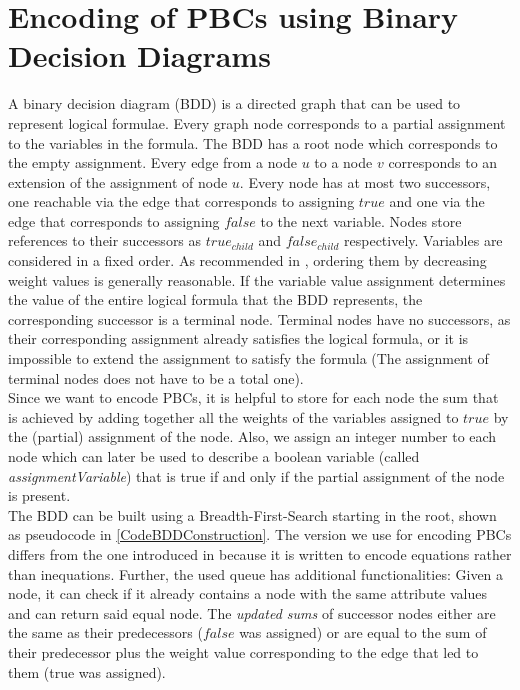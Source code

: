 \section{Encoding of PBCs using Binary Decision Diagrams}\label{PBCEncodingBDD}
A binary decision diagram (BDD) is a directed graph that can be used to represent logical formulae. Every graph node corresponds to a partial assignment to the variables in the formula. The BDD has a root node which corresponds to the empty assignment. Every edge from a node $u$ to a node $v$ corresponds to an extension of the assignment of node $u$. Every node has at most two successors, one reachable via the edge that corresponds to assigning $true$ and one via the edge that corresponds to assigning $false$ to the next variable. Nodes store references to their successors as \emph{$true_{child}$} and \emph{$false_{child}$} respectively. Variables are considered in a fixed order. As recommended in \cite{Een2006TranslatingPC}, ordering them by decreasing weight values is generally reasonable. If the variable value assignment determines the value of the entire logical formula that the BDD represents, the corresponding successor is a terminal node. Terminal nodes have no successors, as their corresponding assignment already satisfies the  logical formula, or it is impossible to extend the  assignment to satisfy the formula (The assignment of terminal nodes does not have to be a total one).\\

Since we want to encode PBCs, it is helpful to store for each node the sum that is achieved by adding together all the weights of the variables assigned to $true$ by the (partial) assignment of the node. Also, we assign an integer number to each node which can later be used to describe a boolean variable (called \emph{assignmentVariable}) that is true if and only if the partial assignment of the node is present. \\

The BDD can be built using a Breadth-First-Search starting in the root, shown as pseudocode in \ref{CodeBDDConstruction}. The version we use for encoding PBCs differs from the one introduced in \cite{Een2006TranslatingPC} because it is written to encode equations rather than inequations. Further, the used queue has additional functionalities: Given a node, it can check if it already contains a node with the same attribute values and can return said equal node. The \emph{updated sums} of successor nodes either are the same as their predecessors ($false$ was assigned) or are equal to the sum of their predecessor plus the weight value corresponding to the edge that led to them (true was assigned).




